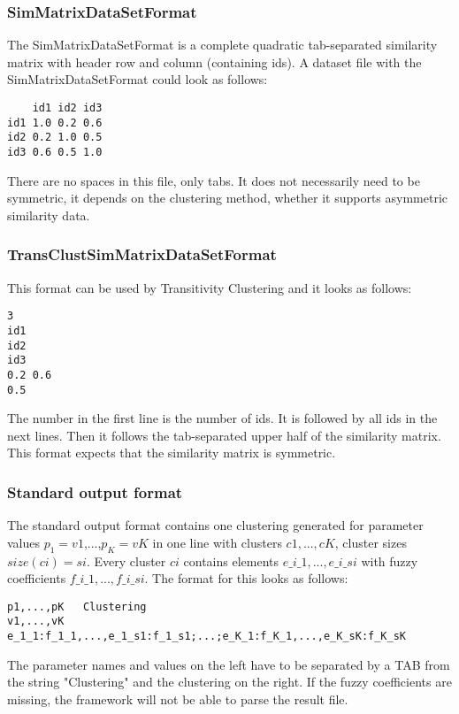 			\subsubsection{SimMatrixDataSetFormat} \label{subsubsec:simmatrixdatasetformat}
			 The SimMatrixDataSetFormat is a complete quadratic tab-separated similarity matrix with header row and column (containing ids). A dataset file with the SimMatrixDataSetFormat could look as follows:
			\begin{lstlisting}
	id1	id2	id3
id1	1.0	0.2	0.6
id2	0.2	1.0	0.5
id3	0.6	0.5	1.0
\end{lstlisting}
			There are no spaces in this file, only tabs. It does not necessarily need to be symmetric, it depends on the clustering method, whether it supports asymmetric similarity data.
			
			\subsubsection{TransClustSimMatrixDataSetFormat}
			This format can be used by Transitivity Clustering and it looks as follows:
			\begin{lstlisting}
3	
id1
id2
id3
0.2	0.6
0.5
\end{lstlisting}

	The number in the first line is the number of ids. It is followed by all ids in the next lines. Then it follows the tab-separated upper half of the similarity matrix. This format expects that the similarity matrix is symmetric.
	

		\subsubsection{Standard output format} \label{subsubsec:standardrunresultformat}
		The standard output format contains one clustering generated for parameter values $p_1=v1$,...,$p_K=vK$ in one line with clusters $c1,...,cK$, cluster sizes $size(ci) = si$. Every cluster $ci$ contains elements $e\_i\_1,...,e\_i\_si$ with fuzzy coefficients $f\_i\_1,...,f\_i\_si$. The format for this looks as follows:
		
		\begin{verbatim}
p1,...,pK	Clustering
v1,...,vK	e_1_1:f_1_1,...,e_1_s1:f_1_s1;...;e_K_1:f_K_1,...,e_K_sK:f_K_sK
	\end{verbatim}
	
	The parameter names and values on the left have to be separated by a TAB from the string "Clustering" and the clustering on the right. If the fuzzy coefficients are missing, the framework will not be able to parse the result file.
		
